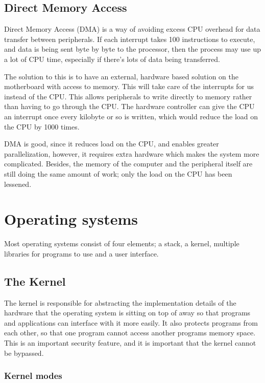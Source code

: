 \subsection{Direct Memory Access}

Direct Memory Access (DMA) is a way of avoiding excess CPU overhead for data
transfer between peripherals. If each interrupt takes 100 instructions to
execute, and data is being sent byte by byte to the processor, then the process
may use up a lot of CPU time, especially if there's lots of data being
transferred.

The solution to this is to have an external, hardware based solution on the
motherboard with access to memory. This will take care of the interrupts for us
instead of the CPU. This allows peripherals to write directly to memory rather
than having to go through the CPU. The hardware controller can give the CPU an
interrupt once every kilobyte or so is written, which would reduce the load on
the CPU by 1000 times.

DMA is good, since it reduces load on the CPU, and enables greater
parallelization, however, it requires extra hardware which makes the system more
complicated. Besides, the memory of the computer and the peripheral itself are
still doing the same amount of work; only the load on the CPU has been lessened.


\section{Operating systems}

Most operating systems consist of four elements; a stack, a kernel, multiple
libraries for programs to use and a user interface.

\subsection{The Kernel}

The kernel is responsible for abstracting the implementation details of the
hardware that the operating system is sitting on top of away so that programs
and applications can interface with it more easily. It also protects programs
from each other, so that one program cannot access another programs memory
space. This is an important security feature, and it is important that the
kernel cannot be bypassed.

\subsubsection{Kernel modes}

